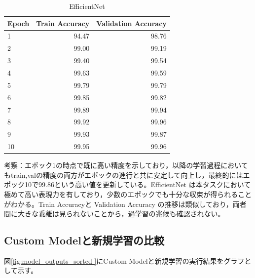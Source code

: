 \documentclass[a4paper,11pt,titlepage]{jsarticle}
\begin{document}
\begin{table}[H]
\centering
\caption{EfficientNet}
\label{tab:efficientnet}
\begin{tabular}{lrr}
\hline
 Epoch &  Train Accuracy &  Validation Accuracy \\
\hline
     1 &           94.47 &                98.76 \\
     2 &           99.00 &                99.19 \\
     3 &           99.40 &                99.54 \\
     4 &           99.63 &                99.59 \\
     5 &           99.79 &                99.79 \\
     6 &           99.85 &                99.82 \\
     7 &           99.89 &                99.94 \\
     8 &           99.92 &                99.96 \\
     9 &           99.93 &                99.87 \\
    10 &           99.95 &                99.96 \\
\hline
\end{tabular}
\end{table}


考察：エポック1の時点で既に高い精度を示しており，以降の学習過程においてもtrain,valの精度の両方がエポックの進行と共に安定して向上し，最終的にはエポック10で99.86という高い値を更新している。EfficientNet は本タスクにおいて極めて高い表現力を有しており，少数のエポックでも十分な収束が得られることがわかる。Train Accuracyと Validation Accuracy の推移は類似しており，両者間に大きな乖離は見られないことから，過学習の兆候も確認されない。


\subsection{Custom Modelと新規学習の比較}
図\ref{fig:model_outputs_sorted }にCustom Modelと新規学習の実行結果をグラフとして示す。
\end{document}
